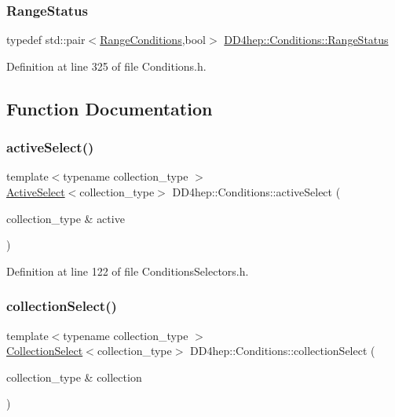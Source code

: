 \subsubsection{\texorpdfstring{Range\+Status}{RangeStatus}}
{\footnotesize\ttfamily typedef std\+::pair$<$\hyperlink{namespace_d_d4hep_1_1_conditions_ae765f0140a33973a430280f02b6062f4}{Range\+Conditions},bool$>$ \hyperlink{namespace_d_d4hep_1_1_conditions_a6fa51615b9757a9ffccb7377f0617ee4}{D\+D4hep\+::\+Conditions\+::\+Range\+Status}}



Definition at line 325 of file Conditions.\+h.



\subsection{Function Documentation}
\hypertarget{namespace_d_d4hep_1_1_conditions_a99e5326b64f1b9135d4c34e32fb3bb4b}{}\label{namespace_d_d4hep_1_1_conditions_a99e5326b64f1b9135d4c34e32fb3bb4b} 
\subsubsection{\texorpdfstring{active\+Select()}{activeSelect()}}
{\footnotesize\ttfamily template$<$typename collection\+\_\+type $>$ \\
\hyperlink{class_d_d4hep_1_1_conditions_1_1_active_select}{Active\+Select}$<$collection\+\_\+type$>$ D\+D4hep\+::\+Conditions\+::active\+Select (\begin{DoxyParamCaption}\item[{collection\+\_\+type \&}]{active }\end{DoxyParamCaption})}



Definition at line 122 of file Conditions\+Selectors.\+h.

\hypertarget{namespace_d_d4hep_1_1_conditions_a4b40993dfb50f69634e7deea27dca6ff}{}\label{namespace_d_d4hep_1_1_conditions_a4b40993dfb50f69634e7deea27dca6ff} 
\subsubsection{\texorpdfstring{collection\+Select()}{collectionSelect()}}
{\footnotesize\ttfamily template$<$typename collection\+\_\+type $>$ \\
\hyperlink{class_d_d4hep_1_1_conditions_1_1_collection_select}{Collection\+Select}$<$collection\+\_\+type$>$ D\+D4hep\+::\+Conditions\+::collection\+Select (\begin{DoxyParamCaption}\item[{collection\+\_\+type \&}]{collection }\end{DoxyParamCaption})}



